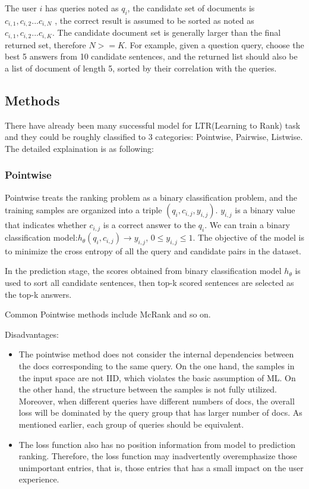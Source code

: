 \documentclass[runningheads]{llncs}
\begin{document}
The user $i$ has queries noted as $q_i$, the candidate set of documents is $c_{i,1}, c_{i,2}...c_{i,N}$ , the correct result is assumed to be sorted as noted as $c_{i,1}, c_{i,2}...c_{i,K}$. The candidate document set is generally larger than the final returned set, therefore $N>=K$. For example, given a question query, choose the best 5 answers from 10 candidate sentences, and the returned list should also be a list of document of length 5, sorted by their correlation with the queries.
\subsection{Methods}
There have already been many successful model for LTR(Learning to Rank) task and they could be roughly classified to 3 categories: Pointwise, Pairwise, Listwise. The detailed explaination is as following:

\subsubsection{Pointwise}
Pointwise treats the ranking problem as a binary classification problem, and the training samples are organized into a triple $(q_{i},c_{i,j},y_{i,j})$. $y_{i,j}$ is a binary value that indicates whether $c_{i,j}$ is a correct answer to the $q_{i}$. We can train a binary classification model:$h_{\theta}(q_{i},c_{i,j})\rightarrow y_{i,j}$, $0 \leq y_{i,j} \leq 1$. The objective of the model is to minimize the cross entropy of all the query and candidate pairs in the dataset.

In the prediction stage, the scores obtained from binary classification model $h_\theta$ is used to sort all candidate sentences, then top-k scored sentences are selected as the top-k answers.

Common Pointwise methods include McRank\cite{li2008mcrank} and so on.

Disadvantages:
\begin{itemize}
    \item The pointwise method does not consider the internal dependencies between the docs corresponding to the same query. On the one hand, the samples in the input space are not IID, which violates the basic assumption of ML. On the other hand, the structure between the samples is not fully utilized. Moreover, when different queries have different numbers of docs, the overall loss will be dominated by the query group that has larger number of docs. As mentioned earlier, each group of queries should be equivalent.
    \item The loss function also has no position information from model to prediction ranking. Therefore, the loss function may inadvertently overemphasize those unimportant entries, that is, those entries that has a small impact on the user experience.
\end{itemize}
\end{document}
